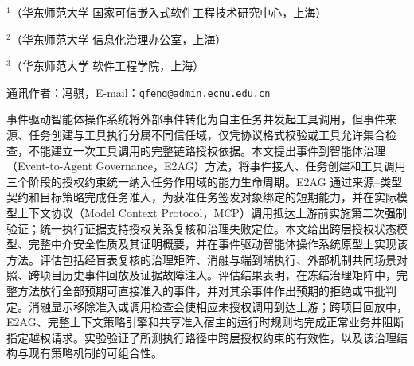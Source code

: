 \thispagestyle{josfirst}


\vspace{7pt}

\vspace{4pt}
\begingroup\fontsize{8pt}{12pt}\selectfont
\noindent$^{1}$（华东师范大学 国家可信嵌入式软件工程技术研究中心，上海）\par
\noindent$^{2}$（华东师范大学 信息化治理办公室，上海）\par
\noindent$^{3}$（华东师范大学 软件工程学院，上海）\par
\noindent 通讯作者：冯骐，E-mail：\texttt{qfeng@admin.ecnu.edu.cn}\par
\endgroup

\begin{joszhabstract}
事件驱动智能体操作系统将外部事件转化为自主任务并发起工具调用，但事件来源、任务创建与工具执行分属不同信任域，仅凭协议格式校验或工具允许集合检查，不能建立一次工具调用的完整链路授权依据。本文提出事件到智能体治理（Event-to-Agent Governance，E2AG）方法，将事件接入、任务创建和工具调用三个阶段的授权约束统一纳入任务作用域的能力生命周期。E2AG 通过来源--类型契约和目标策略完成任务准入，为获准任务签发对象绑定的短期能力，并在实际模型上下文协议（Model Context Protocol，MCP）调用抵达上游前实施第二次强制验证；统一执行证据支持授权关系复核和治理失败定位。本文给出跨层授权状态模型、完整中介安全性质及其证明概要，并在事件驱动智能体操作系统原型上实现该方法。评估包括经盲表复核的治理矩阵、消融与端到端执行、外部机制共同场景对照、跨项目历史事件回放及证据故障注入。评估结果表明，在冻结治理矩阵中，完整方法放行全部预期可直接准入的事件，并对其余事件作出预期的拒绝或审批判定。消融显示移除准入或调用检查会使相应未授权调用到达上游；跨项目回放中，E2AG、完整上下文策略引擎和共享准入宿主的运行时规则均完成正常业务并阻断指定越权请求。实验验证了所测执行路径中跨层授权约束的有效性，以及该治理结构与现有策略机制的可组合性。
\end{joszhabstract}

